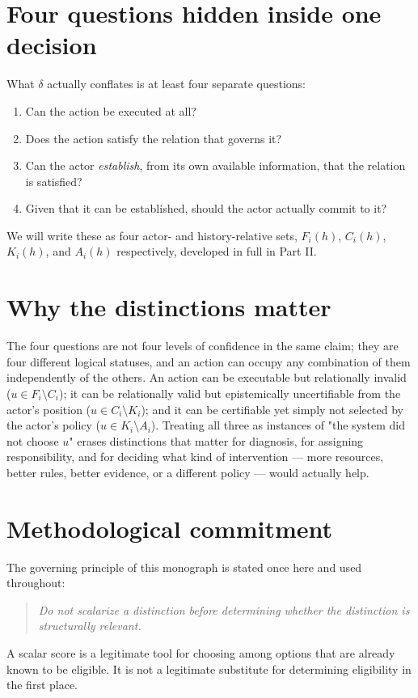 \documentclass[11pt]{report}
\theoremstyle{definition}
\theoremstyle{plain}
\begin{document}
\section{Four questions hidden inside one decision}
What $\delta$ actually conflates is at least four separate questions:
\begin{enumerate}
\item Can the action be executed at all?
\item Does the action satisfy the relation that governs it?
\item Can the actor \emph{establish}, from its own available information, that the relation is satisfied?
\item Given that it can be established, should the actor actually commit to it?
\end{enumerate}
We will write these as four actor- and history-relative sets, $F_i(h)$, $C_i(h)$, $K_i(h)$, and $A_i(h)$ respectively, developed in full in Part II.

\section{Why the distinctions matter}
The four questions are not four levels of confidence in the same claim; they are four different logical statuses, and an action can occupy any combination of them independently of the others. An action can be executable but relationally invalid ($u \in F_i \setminus C_i$); it can be relationally valid but epistemically uncertifiable from the actor's position ($u \in C_i \setminus K_i$); and it can be certifiable yet simply not selected by the actor's policy ($u \in K_i \setminus A_i$). Treating all three as instances of "the system did not choose $u$" erases distinctions that matter for diagnosis, for assigning responsibility, and for deciding what kind of intervention --- more resources, better rules, better evidence, or a different policy --- would actually help.

\section{Methodological commitment}
The governing principle of this monograph is stated once here and used throughout:
\begin{quote}
\emph{Do not scalarize a distinction before determining whether the distinction is structurally relevant.}
\end{quote}
A scalar score is a legitimate tool for choosing among options that are already known to be eligible. It is not a legitimate substitute for determining eligibility in the first place.
\end{document}
